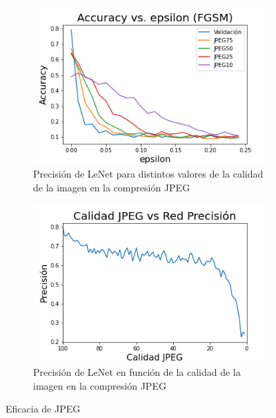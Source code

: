 \begin{figure}[h!]
    \centering
    \begin{subfigure}[b]{0.48\textwidth}
        \centering
        \includegraphics[width=\textwidth]{images/cifar-10/cifar_epsilon_accuracy.png}
        \caption{Precisión de LeNet para distintos valores de la calidad de la imagen en la compresión JPEG}
        \label{cifar_jpeg_accuracy}
    \end{subfigure}
    \hspace{4mm}
    \begin{subfigure}[b]{0.48\textwidth}
        \centering
        \includegraphics[width=\textwidth]{images/cifar-10/cifar_JPEG_accuracy.png}
        \caption{Precisión de LeNet en función de la calidad de la imagen en la compresión JPEG}
        \label{cifar_accuracy_epsilon}
    \end{subfigure}
    \caption{Eficacia de JPEG}
    \label{cifrar_accuracy}
\end{figure}



